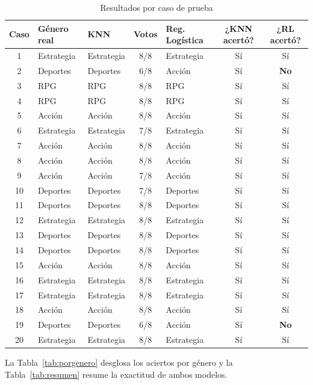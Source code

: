 \documentclass[]{article}
\begin{document}
\begin{table}[H]
\centering
\small
\caption{Resultados por caso de prueba}
\label{tab:casos}
\begin{tabular}{c l l c l c c}
\toprule
\textbf{Caso} & \textbf{Género real} & \textbf{KNN} & \textbf{Votos} & \textbf{Reg. Logística} & \textbf{¿KNN acertó?} & \textbf{¿RL acertó?} \\
\midrule
1 & Estrategia & Estrategia & 8/8 & Estrategia & Sí & Sí \\
2 & Deportes & Deportes & 6/8 & Acción & Sí & \textbf{No} \\
3 & RPG & RPG & 8/8 & RPG & Sí & Sí \\
4 & RPG & RPG & 8/8 & RPG & Sí & Sí \\
5 & Acción & Acción & 8/8 & Acción & Sí & Sí \\
6 & Estrategia & Estrategia & 7/8 & Estrategia & Sí & Sí \\
7 & Acción & Acción & 8/8 & Acción & Sí & Sí \\
8 & Acción & Acción & 8/8 & Acción & Sí & Sí \\
9 & Acción & Acción & 7/8 & Acción & Sí & Sí \\
10 & Deportes & Deportes & 7/8 & Deportes & Sí & Sí \\
11 & Deportes & Deportes & 8/8 & Deportes & Sí & Sí \\
12 & Estrategia & Estrategia & 8/8 & Estrategia & Sí & Sí \\
13 & Deportes & Deportes & 8/8 & Deportes & Sí & Sí \\
14 & Deportes & Deportes & 8/8 & Deportes & Sí & Sí \\
15 & Acción & Acción & 8/8 & Acción & Sí & Sí \\
16 & Estrategia & Estrategia & 8/8 & Estrategia & Sí & Sí \\
17 & Estrategia & Estrategia & 8/8 & Estrategia & Sí & Sí \\
18 & Acción & Acción & 8/8 & Acción & Sí & Sí \\
19 & Deportes & Deportes & 6/8 & Acción & Sí & \textbf{No} \\
20 & Estrategia & Estrategia & 8/8 & Estrategia & Sí & Sí \\
\bottomrule
\end{tabular}
\end{table}

La Tabla~\ref{tab:porgenero} desglosa los aciertos por género y la Tabla~\ref{tab:resumen} resume la exactitud de ambos modelos.
\end{document}
